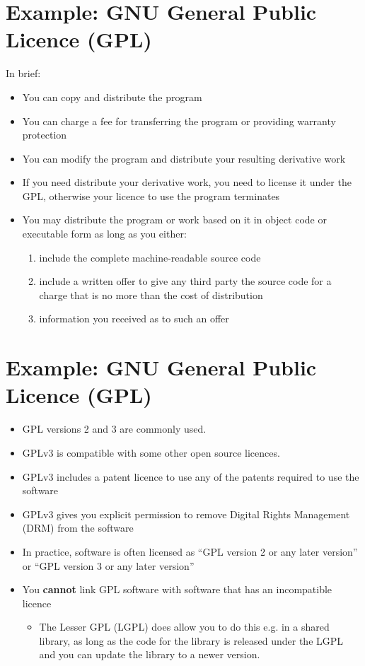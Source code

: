\documentclass{article}
\begin{document}
\section{Example: GNU General Public Licence (GPL)}
In brief:
\begin{itemize}
\item You can copy and distribute the program
\item You can charge a fee for transferring the program or providing warranty protection
\item You can modify the program and distribute your resulting derivative work
\item If you need distribute your derivative work, you need to license it under the GPL, otherwise your licence to use the program terminates
\item You may distribute the program or work based on it in object code or executable form as long as you either:
\begin{enumerate}
\item include the complete machine-readable source code
\item include a written offer to give any third party the source code for a charge that is no more than the cost of distribution
\item information you received as to such an offer
\end{enumerate}
\end{itemize}



\section{Example: GNU General Public Licence (GPL)}
\begin{itemize}
\item GPL versions 2 and 3 are commonly used.
\item GPLv3 is compatible with some other open source licences.
\item GPLv3 includes a patent licence to use any of the patents required to use the software
\item GPLv3 gives you explicit permission to remove Digital Rights Management (DRM) from the software
\item In practice, software is often licensed as ``GPL version 2 or any later version'' or ``GPL version 3 or any later version''
\item You {\bf cannot} link GPL software with software that has an incompatible licence
\begin{itemize}
\item The Lesser GPL (LGPL) does allow you to do this e.g. in a shared library, as long as the code for the library is released under the LGPL and you can update the library to a newer version.
\end{itemize}
\end{itemize}
\end{document}
